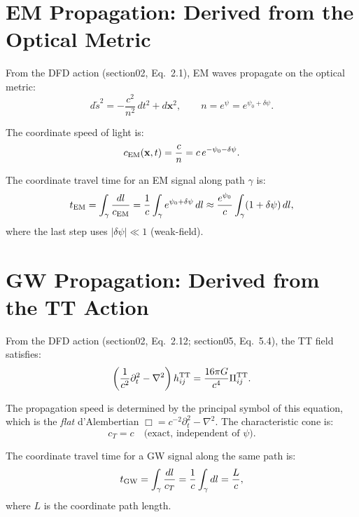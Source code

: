 \documentclass[11pt]{article}
\begin{document}
\section{EM Propagation: Derived from the Optical Metric}

From the DFD action (section02, Eq.~2.1), EM waves propagate on the
optical metric:
\begin{equation}
d\tilde{s}^2 = -\frac{c^2}{n^2}\,dt^2 + d\mathbf{x}^2, \qquad
n = e^{\psi} = e^{\psi_0 + \delta\psi}.
\end{equation}

The coordinate speed of light is:
\begin{equation}
c_{\rm EM}(\mathbf{x}, t) = \frac{c}{n} = c\,e^{-\psi_0 - \delta\psi}.
\end{equation}

The coordinate travel time for an EM signal along path $\gamma$ is:
\begin{equation}\label{eq:t-EM}
t_{\rm EM} = \int_\gamma \frac{dl}{c_{\rm EM}} = \frac{1}{c}\int_\gamma
e^{\psi_0 + \delta\psi}\,dl
\approx \frac{e^{\psi_0}}{c}\int_\gamma (1 + \delta\psi)\,dl,
\end{equation}
where the last step uses $|\delta\psi| \ll 1$ (weak-field).

\section{GW Propagation: Derived from the TT Action}

From the DFD action (section02, Eq.~2.12; section05, Eq.~5.4), the
TT field satisfies:
\begin{equation}
\left(\frac{1}{c^2}\partial_t^2 - \nabla^2\right)h_{ij}^{\rm TT}
= \frac{16\pi G}{c^4}\Pi_{ij}^{\rm TT}.
\end{equation}

The propagation speed is determined by the principal symbol of this
equation, which is the \emph{flat} d'Alembertian $\Box = c^{-2}
\partial_t^2 - \nabla^2$. The characteristic cone is:
\begin{equation}
c_T = c \quad \text{(exact, independent of $\psi$)}.
\end{equation}

The coordinate travel time for a GW signal along the same path is:
\begin{equation}\label{eq:t-GW}
t_{\rm GW} = \int_\gamma \frac{dl}{c_T} = \frac{1}{c}\int_\gamma dl
= \frac{L}{c},
\end{equation}
where $L$ is the coordinate path length.
\end{document}

